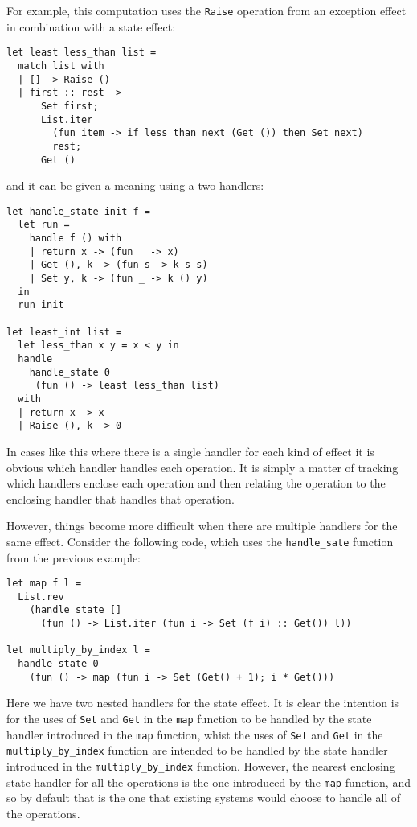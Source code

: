 \documentclass{article}
\newcommand{\code}[2][ocaml]{\lstinline[style={#1}]{#2}}
\begin{document}
For example, this computation uses the \code{Raise} operation from an
exception effect in combination with a state effect:
\begin{lstlisting}
let least less_than list =
  match list with
  | [] -> Raise ()
  | first :: rest ->
      Set first;
      List.iter
        (fun item -> if less_than next (Get ()) then Set next)
        rest;
      Get ()
\end{lstlisting}
and it can be given a meaning using a two handlers:
\begin{lstlisting}
let handle_state init f =
  let run =
    handle f () with
    | return x -> (fun _ -> x)
    | Get (), k -> (fun s -> k s s)
    | Set y, k -> (fun _ -> k () y)
  in
  run init

let least_int list =
  let less_than x y = x < y in
  handle
    handle_state 0
     (fun () -> least less_than list)
  with
  | return x -> x
  | Raise (), k -> 0
\end{lstlisting}

In cases like this where there is a single handler for each kind of
effect it is obvious which handler handles each operation. It is simply
a matter of tracking which handlers enclose each operation and then
relating the operation to the enclosing handler that handles that
operation.

However, things become more difficult when there are multiple handlers
for the same effect. Consider the following code, which uses the
\code{handle_sate} function from the previous example:
\begin{lstlisting}
let map f l =
  List.rev
    (handle_state []
      (fun () -> List.iter (fun i -> Set (f i) :: Get()) l))

let multiply_by_index l =
  handle_state 0
    (fun () -> map (fun i -> Set (Get() + 1); i * Get()))
\end{lstlisting}
Here we have two nested handlers for the state effect. It is clear the
intention is for the uses of \code{Set} and \code{Get} in the \code{map}
function to be handled by the state handler introduced in the \code{map}
function, whist the uses of \code{Set} and \code{Get} in the
\code{multiply_by_index} function are intended to be handled by the
state handler introduced in the \code{multiply_by_index}
function. However, the nearest enclosing state handler for all the
operations is the one introduced by the \code{map} function, and so by
default that is the one that existing systems would choose to handle
all of the operations.
\end{document}
